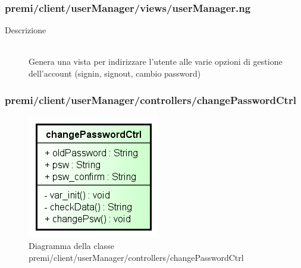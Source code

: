 \subsubsection{premi/client/userManager/views/userManager.ng}

\begin{description}
\item[Descrizione] \hfill \\
	Genera una vista per indirizzare l'utente alle varie opzioni di gestione dell'account (signin, signout, cambio password)
\end{description}

















\subsubsection{premi/client/userManager/controllers/changePasswordCtrl}
\begin{figure}[h]
\begin{center}
\includegraphics[scale=0.55]{img/diacla/changePasswordCtrl.png}
\caption{Diagramma della classe premi/client/userManager/controllers/changePasswordCtrl}
\end{center}
\end{figure}


